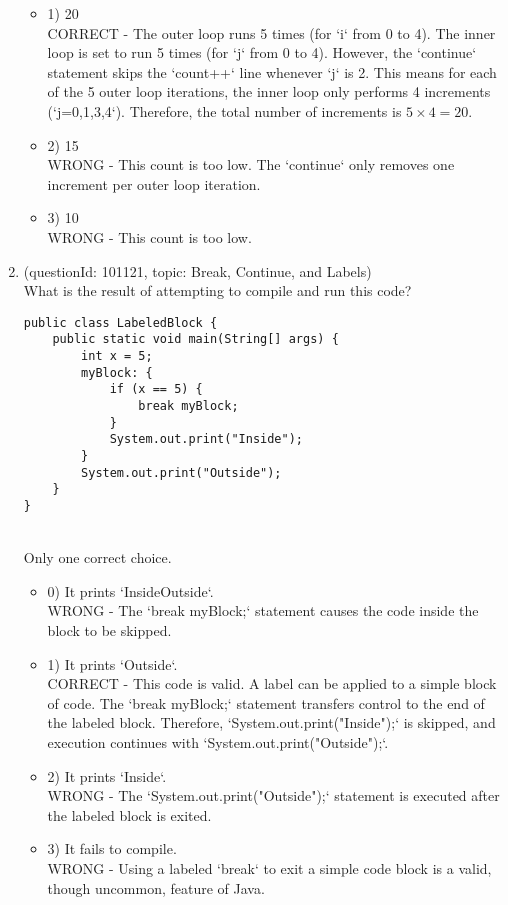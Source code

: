 \documentclass[12pt]{article}
\begin{document}
\begin{enumerate}[label=(\arabic*)]
\begin{itemize}
\item 1) 20
 \\ 
CORRECT - The outer loop runs 5 times (for `i` from 0 to 4). The inner loop is set to run 5 times (for `j` from 0 to 4). However, the `continue` statement skips the `count++` line whenever `j` is 2. This means for each of the 5 outer loop iterations, the inner loop only performs 4 increments (`j=0,1,3,4`). Therefore, the total number of increments is $5 \times 4 = 20$.

\item 2) 15
 \\ 
WRONG - This count is too low. The `continue` only removes one increment per outer loop iteration.

\item 3) 10
 \\ 
WRONG - This count is too low.

\end{itemize}
\item (questionId: 101121, topic: Break, Continue, and Labels) \\ 
What is the result of attempting to compile and run this code?\n\begin{verbatim}
public class LabeledBlock {
    public static void main(String[] args) {
        int x = 5;
        myBlock: {
            if (x == 5) {
                break myBlock;
            }
            System.out.print("Inside");
        }
        System.out.print("Outside");
    }
}
\end{verbatim}
\\ \noindent Only one correct choice. 
\begin{itemize}
\item 0) It prints `InsideOutside`.
 \\ 
WRONG - The `break myBlock;` statement causes the code inside the block to be skipped.

\item 1) It prints `Outside`.
 \\ 
CORRECT - This code is valid. A label can be applied to a simple block of code. The `break myBlock;` statement transfers control to the end of the labeled block. Therefore, `System.out.print("Inside");` is skipped, and execution continues with `System.out.print("Outside");`.

\item 2) It prints `Inside`.
 \\ 
WRONG - The `System.out.print("Outside");` statement is executed after the labeled block is exited.

\item 3) It fails to compile.
 \\ 
WRONG - Using a labeled `break` to exit a simple code block is a valid, though uncommon, feature of Java.

\end{itemize}

\end{enumerate}
\end{document}
